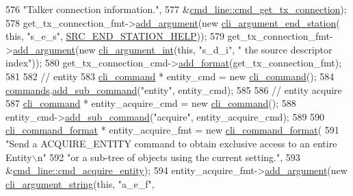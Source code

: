 \begin{DoxyCode}
576         \textcolor{stringliteral}{"Talker connection information."},
577         &\hyperlink{classcmd__line_afbf6ddf3b87cb81058a69556fde9d9be}{cmd\_line::cmd\_get\_tx\_connection});
578     get\_tx\_connection\_fmt->\hyperlink{classcli__command__format_ac3fc6d13a227c195d5ee6f7b78eba9cd}{add\_argument}(\textcolor{keyword}{new} \hyperlink{classcli__argument__end__station}{cli\_argument\_end\_station}(\textcolor{keyword}{
      this}, \textcolor{stringliteral}{"s\_e\_s"}, \hyperlink{cmd__line_8cpp_a74df33715dde99b760d515a90f164e1e}{SRC\_END\_STATION\_HELP}));
579     get\_tx\_connection\_fmt->\hyperlink{classcli__command__format_ac3fc6d13a227c195d5ee6f7b78eba9cd}{add\_argument}(\textcolor{keyword}{new} \hyperlink{classcli__argument__int}{cli\_argument\_int}(\textcolor{keyword}{this}, \textcolor{stringliteral}{"s\_d\_i"}, \textcolor{stringliteral}{"
      the source descriptor index"}));
580     get\_tx\_connection\_cmd->\hyperlink{classcli__command_aa9ec38e761644d946f8db2b920e39921}{add\_format}(get\_tx\_connection\_fmt);
581 
582     \textcolor{comment}{// entity}
583     \hyperlink{classcli__command}{cli\_command} * entity\_cmd = \textcolor{keyword}{new} \hyperlink{classcli__command}{cli\_command}();
584     \hyperlink{classcmd__line_ae4fea670c2fdd2b60f7b5b6ad6fbaf1e}{commands}.\hyperlink{classcli__command_aa73a67e8ebb6facd4b40ced66279b226}{add\_sub\_command}(\textcolor{stringliteral}{"entity"}, entity\_cmd);
585 
586     \textcolor{comment}{// entity acquire}
587     \hyperlink{classcli__command}{cli\_command} * entity\_acquire\_cmd = \textcolor{keyword}{new} \hyperlink{classcli__command}{cli\_command}();
588     entity\_cmd->\hyperlink{classcli__command_aa73a67e8ebb6facd4b40ced66279b226}{add\_sub\_command}(\textcolor{stringliteral}{"acquire"}, entity\_acquire\_cmd);
589 
590     \hyperlink{classcli__command__format}{cli\_command\_format} * entity\_acquire\_fmt = \textcolor{keyword}{new} 
      \hyperlink{classcli__command__format}{cli\_command\_format}(
591         \textcolor{stringliteral}{"Send a ACQUIRE\_ENTITY command to obtain exclusive access to an entire Entity\(\backslash\)n"}
592         \textcolor{stringliteral}{"or a sub-tree of objects using the current setting."},
593         &\hyperlink{classcmd__line_aab543450aab7d747196e9c57ae393081}{cmd\_line::cmd\_acquire\_entity});
594     entity\_acquire\_fmt->\hyperlink{classcli__command__format_ac3fc6d13a227c195d5ee6f7b78eba9cd}{add\_argument}(\textcolor{keyword}{new} \hyperlink{classcli__argument__string}{cli\_argument\_string}(\textcolor{keyword}{this}, \textcolor{stringliteral}{"a\_e\_f"}, \textcolor{stringliteral}{
}
\end{DoxyCode}
